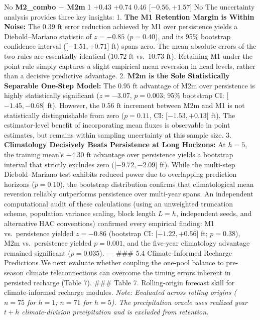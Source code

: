 \documentclass[11pt]{article}
\begin{document}
No \textbar{} \textbar{} \textbf{M2\_combo \(-\) M2m} \textbar{} 1
\textbar{} \(+0.43\) \textbar{} \(+0.74\) \textbar{} 0.46 \textbar{}
{[}\(-0.56, +1.57\){]} \textbar{} No \textbar{} The uncertainty analysis
provides three key insights: 1. \textbf{The M1 Retention Margin is
Within Noise:} The \(0.39\text{ ft}\) error reduction achieved by M1
over persistence yields a Diebold--Mariano statistic of \(z = -0.85\)
(\(p = 0.40\)), and its 95\% bootstrap confidence interval
({[}\(-1.51, +0.71\){]} ft) spans zero. The mean absolute errors of the
two rules are essentially identical (\(10.72\text{ ft}\)
vs.~\(10.73\text{ ft}\)). Retaining M1 under the point rule simply
captures a slight empirical mean reversion in head levels, rather than a
decisive predictive advantage. 2. \textbf{M2m is the Sole Statistically
Separable One-Step Model:} The \(0.95\text{ ft}\) advantage of M2m over
persistence is highly statistically significant (\(z = -3.07\),
\(p = 0.003\); 95\% bootstrap CI: {[}\(-1.45, -0.68\){]} ft). However,
the \(0.56\text{ ft}\) increment between M2m and M1 is not statistically
distinguishable from zero (\(p = 0.11\), CI: {[}\(-1.53, +0.13\){]} ft).
The estimator-level benefit of incorporating mean fluxes is observable
in point estimates, but remains within sampling uncertainty at this
sample size. 3. \textbf{Climatology Decisively Beats Persistence at Long
Horizons:} At \(h=5\), the training mean's \(-4.30\text{ ft}\) advantage
over persistence yields a bootstrap interval that strictly excludes zero
({[}\(-9.72, -2.09\){]} ft). While the multi-step Diebold--Mariano test
exhibits reduced power due to overlapping prediction horizons
(\(p = 0.10\)), the bootstrap distribution confirms that climatological
mean reversion reliably outperforms persistence over multi-year spans.
An independent computational audit of these calculations (using an
unweighted truncation scheme, population variance scaling, block length
\(L=h\), independent seeds, and alternative HAC conventions) confirmed
every empirical finding: M1 vs.~persistence yielded \(z = -0.86\)
(bootstrap CI: {[}\(-1.22, +0.56\){]} ft; \(p = 0.38\)), M2m
vs.~persistence yielded \(p = 0.001\), and the five-year climatology
advantage remained significant (\(p = 0.035\)). --- \#\#\# 5.4
Climate-Informed Recharge Predictions We next evaluate whether coupling
the one-pool balance to pre-season climate teleconnections can overcome
the timing errors inherent in persisted recharge (Table 7). \#\#\# Table
7. Rolling-origin forecast skill for climate-informed recharge modules.
\emph{Note: Evaluated across rolling origins (\(n=75\) for \(h=1\);
\(n=71\) for \(h=5\)). The precipitation oracle uses realized year
\(t+h\) climate-division precipitation and is excluded from retention.}
\end{document}
